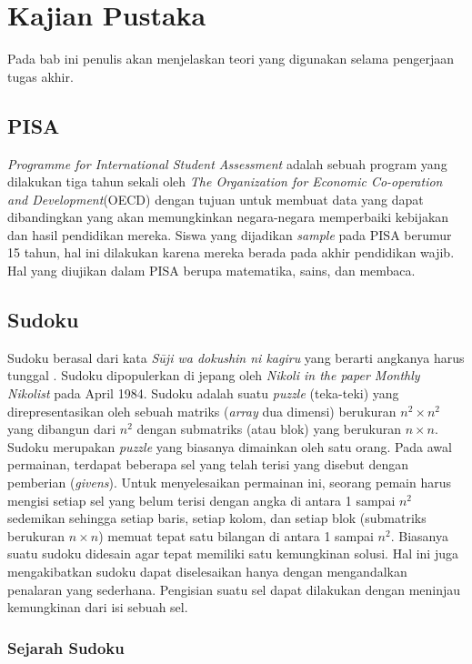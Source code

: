 \chapter{Kajian Pustaka}

Pada bab ini penulis akan menjelaskan teori yang digunakan selama pengerjaan tugas akhir.

\section{PISA}

\textit{Programme for International Student Assessment} adalah sebuah program yang dilakukan tiga tahun sekali oleh \textit{The Organization for Economic Co-operation and Development}(OECD) dengan tujuan untuk membuat data yang dapat dibandingkan yang akan memungkinkan negara-negara memperbaiki kebijakan dan hasil pendidikan mereka. Siswa yang dijadikan \textit{sample} pada PISA berumur 15 tahun, hal ini dilakukan karena mereka berada pada akhir pendidikan wajib. Hal yang diujikan dalam PISA berupa matematika, sains, dan membaca.

\section{Sudoku}

Sudoku berasal dari kata \textit{Sūji wa dokushin ni kagiru} yang berarti angkanya harus tunggal \cite{SATPy3}. Sudoku dipopulerkan di jepang oleh \textit{Nikoli in the paper Monthly Nikolist} pada April 1984. Sudoku adalah suatu \textit{puzzle} (teka-teki) yang direpresentasikan oleh sebuah matriks (\textit{array}
dua dimensi) berukuran ${n^2 \times n^2}$  yang dibangun dari ${n^2}$ dengan submatriks (atau blok)
yang berukuran ${n \times n}$. Sudoku merupakan \textit{puzzle}
yang biasanya dimainkan oleh satu orang.  Pada
awal permainan, terdapat beberapa sel yang telah terisi yang disebut dengan pemberian
(\textit{givens}). Untuk menyelesaikan permainan ini, seorang pemain harus mengisi setiap sel yang
belum terisi dengan angka di antara 1 sampai
$n^2$ sedemikan sehingga setiap baris, setiap kolom,
dan setiap blok (submatriks berukuran $n \times n$) memuat tepat satu bilangan di antara 1 sampai $n^2$. Biasanya suatu sudoku didesain agar tepat memiliki satu kemungkinan solusi. Hal
ini juga mengakibatkan sudoku dapat diselesaikan hanya dengan mengandalkan penalaran
yang sederhana. Pengisian suatu sel dapat dilakukan dengan meninjau kemungkinan dari
isi sebuah sel.

\subsection{Sejarah Sudoku}

